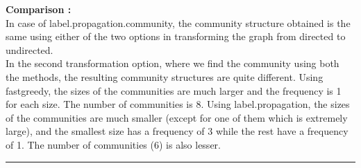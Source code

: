 \documentclass{article}
\begin{document}
\textbf{Comparison :}\\
In case of label.propagation.community, the community structure obtained is the same using either of the two options in
transforming the graph from directed to undirected.\\
In the second transformation option, where we find the community using both the methods, the resulting community structures
are quite different. Using fastgreedy, the sizes of the communities are much larger and the frequency is 1 for each size.
The number of communities is 8.
Using label.propagation, the sizes of the communities are much smaller (except for one of them which is extremely large), and 
the smallest size has a frequency of 3 while the rest have a frequency of 1. The number of communities (6) is also lesser.\\

\hrule
\end{document}
